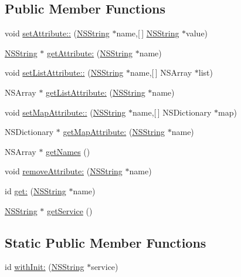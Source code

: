 \subsection*{\-Public \-Member \-Functions}
\begin{DoxyCompactItemize}
\item 
void \hyperlink{interface_location_request_a14afde39e526e8a3d895f1b67e2d249b}{set\-Attribute\-::} (\hyperlink{class_n_s_string}{\-N\-S\-String} $\ast$name,\mbox{[}$\,$\mbox{]} \hyperlink{class_n_s_string}{\-N\-S\-String} $\ast$value)
\item 
\hyperlink{class_n_s_string}{\-N\-S\-String} $\ast$ \hyperlink{interface_location_request_ae910d9de7dae6c493e3db426d0066df0}{get\-Attribute\-:} (\hyperlink{class_n_s_string}{\-N\-S\-String} $\ast$name)
\item 
void \hyperlink{interface_location_request_a63607af36095b555f34fba19ae920ce6}{set\-List\-Attribute\-::} (\hyperlink{class_n_s_string}{\-N\-S\-String} $\ast$name,\mbox{[}$\,$\mbox{]} \-N\-S\-Array $\ast$list)
\item 
\-N\-S\-Array $\ast$ \hyperlink{interface_location_request_ab5f224effefee6fbf769f769cb387134}{get\-List\-Attribute\-:} (\hyperlink{class_n_s_string}{\-N\-S\-String} $\ast$name)
\item 
void \hyperlink{interface_location_request_a17a795ea897ae93b544e8942a65635aa}{set\-Map\-Attribute\-::} (\hyperlink{class_n_s_string}{\-N\-S\-String} $\ast$name,\mbox{[}$\,$\mbox{]} \-N\-S\-Dictionary $\ast$map)
\item 
\-N\-S\-Dictionary $\ast$ \hyperlink{interface_location_request_a4f56d4c499ffeb5d7836da4ec286e4a8}{get\-Map\-Attribute\-:} (\hyperlink{class_n_s_string}{\-N\-S\-String} $\ast$name)
\item 
\-N\-S\-Array $\ast$ \hyperlink{interface_location_request_ab92147a7b93b66b607ef51034ccd9710}{get\-Names} ()
\item 
void \hyperlink{interface_location_request_aa7193ce2b4e55be1d4f70cceb35ace27}{remove\-Attribute\-:} (\hyperlink{class_n_s_string}{\-N\-S\-String} $\ast$name)
\item 
id \hyperlink{interface_location_request_a1bb0d8ea1a074c97deb36d3c2f83aaa2}{get\-:} (\hyperlink{class_n_s_string}{\-N\-S\-String} $\ast$name)
\item 
\hyperlink{class_n_s_string}{\-N\-S\-String} $\ast$ \hyperlink{interface_location_request_a30d8cec794183f22633a5e40241a7553}{get\-Service} ()
\end{DoxyCompactItemize}
\subsection*{\-Static \-Public \-Member \-Functions}
\begin{DoxyCompactItemize}
\item 
id \hyperlink{interface_location_request_a81a50039b6ad405612433b6ab53afea1}{with\-Init\-:} (\hyperlink{class_n_s_string}{\-N\-S\-String} $\ast$service)
\end{DoxyCompactItemize}
